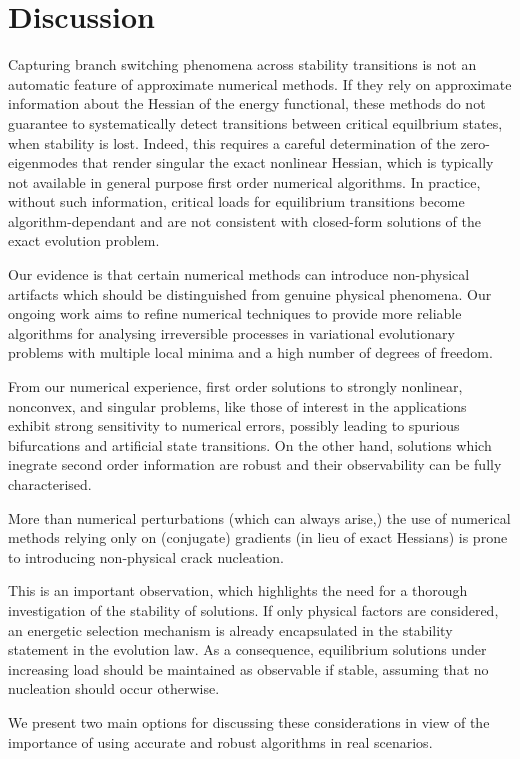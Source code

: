 \documentclass[10pt]{article}
\begin{document}
\section{Discussion} 
\label{sec:discussion}
%
    Capturing branch switching phenomena across stability transitions is not an automatic feature of approximate numerical methods. If they rely on approximate information about the Hessian of the energy functional, these methods do not guarantee to systematically detect transitions between critical equilbrium states, when stability is lost. 
Indeed, this requires a careful determination of the zero-eigenmodes that render singular the exact nonlinear Hessian, which is typically not available in general purpose first order numerical algorithms.
In practice, without such information, critical loads for equilibrium transitions become algorithm-dependant and are not consistent with closed-form solutions of the exact evolution problem.


Our evidence is that certain numerical methods can introduce non-physical artifacts which should be distinguished from genuine physical phenomena. Our ongoing work aims to refine numerical techniques to provide more reliable algorithms for analysing irreversible processes in variational evolutionary problems with multiple local minima and a high number of degrees of freedom.

From our numerical experience, first order solutions to strongly nonlinear, nonconvex, and singular problems, like those of interest in the applications exhibit strong sensitivity to numerical errors, possibly leading to spurious bifurcations and artificial state transitions. On the other hand, solutions which inegrate second order information are robust and their observability can be fully characterised.

More than numerical perturbations (which can always arise,) the use of numerical methods relying only on (conjugate) gradients (in lieu of exact Hessians) is prone to introducing non-physical crack nucleation.

This is an important observation, which highlights the need for a thorough investigation of the stability of solutions. 
If only physical factors are considered, an energetic selection mechanism is already encapsulated in the stability statement in the evolution law. As a consequence, equilibrium solutions under increasing load should be maintained as observable if stable, assuming that no nucleation should occur otherwise.

We present two main options for discussing these considerations in view of the importance of using accurate and robust algorithms in real scenarios.
\end{document}
